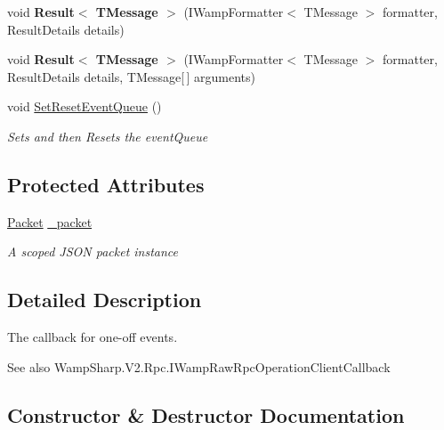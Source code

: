 \begin{DoxyCompactItemize}
\mbox{\label{class_waapi_c_s_1_1_communication_1_1_callback_a2e1a0432452602251f1ec942b6825d32}} 
void {\bfseries Result$<$ T\+Message $>$} (I\+Wamp\+Formatter$<$ T\+Message $>$ formatter, Result\+Details details)
\item 
\mbox{\label{class_waapi_c_s_1_1_communication_1_1_callback_a2a4b9894773dfe3cf61c472ef23c0eee}} 
void {\bfseries Result$<$ T\+Message $>$} (I\+Wamp\+Formatter$<$ T\+Message $>$ formatter, Result\+Details details, T\+Message\mbox{[}$\,$\mbox{]} arguments)
\item 
void \mbox{\hyperlink{class_waapi_c_s_1_1_communication_1_1_callback_ae47f6b5427e0641933b4e144854fa2fe}{Set\+Reset\+Event\+Queue}} ()
\begin{DoxyCompactList}\small\item\em Sets and then Resets the event\+Queue \end{DoxyCompactList}\end{DoxyCompactItemize}
\subsection*{Protected Attributes}
\begin{DoxyCompactItemize}
\item 
\mbox{\hyperlink{class_waapi_c_s_1_1_communication_1_1_packet}{Packet}} \mbox{\hyperlink{class_waapi_c_s_1_1_communication_1_1_callback_afd3dc6685a14d9535edb1bb100f8b9b9}{\+\_\+packet}}
\begin{DoxyCompactList}\small\item\em A scoped J\+S\+ON packet instance \end{DoxyCompactList}\end{DoxyCompactItemize}


\subsection{Detailed Description}
The callback for one-\/off events. 

\begin{DoxySeeAlso}{See also}
Wamp\+Sharp.\+V2.\+Rpc.\+I\+Wamp\+Raw\+Rpc\+Operation\+Client\+Callback


\end{DoxySeeAlso}


\subsection{Constructor \& Destructor Documentation}
\mbox{\label{class_waapi_c_s_1_1_communication_1_1_callback_a4b5984e205bd38b0be0d0d843c0681d1}} 
